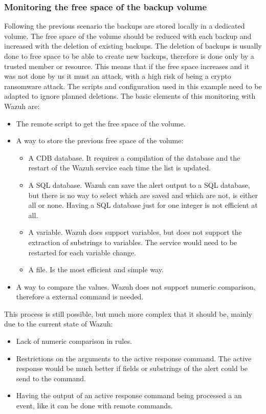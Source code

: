 \subsubsection{Monitoring the free space of the backup volume} \label{free_space_volume}
Following the previous scenario the backups are stored locally in a dedicated volume.
The free space of the volume should be reduced with each backup and increased with the deletion of existing backups.
\linej
The deletion of backups is usually done to free space to be able to create new backups, therefore is done only by a trusted member or resource.
This means that if the free space increases and it was not done by us it must an attack, with a high risk of being a crypto ransomware attack.
\linej
The scripts and configuration used in this example need to be adapted to ignore planned deletions.
\linej
\linej
The basic elements of this monitoring with Wazuh are:
\begin{itemize}
	\item The remote script to get the free space of the volume.
	\item A way to store the previous free space of the volume:
	\begin{itemize}
		\item A CDB database. It requires a compilation of the database and the restart of the Wazuh service each time the list is updated.
		\item A SQL database. Wazuh can save the alert output to a SQL database, but there is no way to select which are saved and which are not, is either all or none. Having a SQL database just for one integer is not efficient at all.
		\item A variable. Wazuh does support variables, but does not support the extraction of substrings to variables. The service would need to be restarted for each variable change.
		\item A file. Is the most efficient and simple way.
	\end{itemize}
	\item A way to compare the values. Wazuh does not support numeric comparison, therefore a external command is needed.
\end{itemize}
\linej
This process is still possible, but much more complex that it should be, mainly due to the current state of Wazuh:
\begin{itemize}
	\item Lack of numeric comparison in rules.
	\item Restrictions on the arguments to the active response command. The active response would be much better if fields or substrings of the alert could be send to the command.
	\item Having the output of an active response command being processed a an event, like it can be done with remote commands.
\end{itemize}

